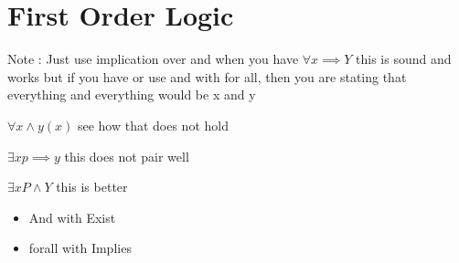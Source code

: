 \documentclass{article}
\theoremstyle{mytheoremstyle}
\theoremstyle{mytheoremstyle}
\theoremstyle{myproblemstyle}
\begin{document}
\section{First Order Logic}
Note : Just use implication over and
when you have
\begin{math}
	\forall x \implies Y
\end{math}
this is sound and works but if you have or use and with for all, then you are stating that everything and everything would be x and y

\begin{math}
	\forall x \land  y(x)
\end{math}
see how that does not hold

\begin{math}
	\exists xp \implies y
\end{math}
this does not pair well

\begin{math}
	\exists  xP \land Y
\end{math}
this is better

\begin{itemize}
	\item And with Exist
	\item forall with Implies
\end{itemize}
\end{document}
